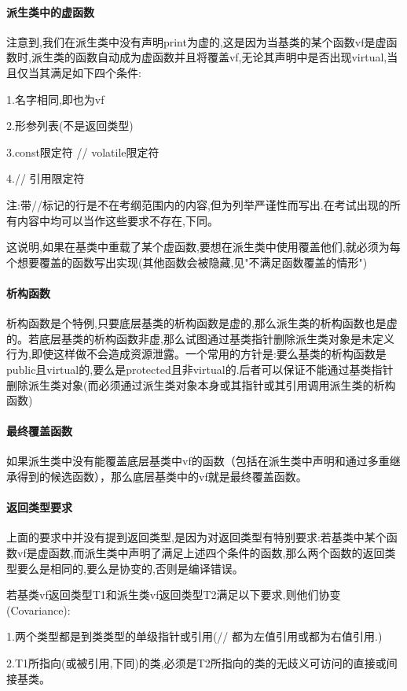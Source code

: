\documentclass[UTF8]{ctexart}
\begin{document}
\paragraph{派生类中的虚函数}
注意到,我们在派生类中没有声明print为虚的,这是因为当基类的某个函数vf是虚函数时,派生类的函数自动成为虚函数并且将覆盖vf,无论其声明中是否出现virtual,当且仅当其满足如下四个条件:

1.名字相同,即也为vf

2.形参列表(不是返回类型)

3.const限定符 // volatile限定符

4.// 引用限定符

注:带//标记的行是不在考纲范围内的内容,但为列举严谨性而写出.在考试出现的所有内容中均可以当作这些要求不存在,下同。

这说明,如果在基类中重载了某个虚函数,要想在派生类中使用覆盖他们,就必须为每个想要覆盖的函数写出实现(其他函数会被隐藏,见"不满足函数覆盖的情形")

\paragraph{析构函数}
析构函数是个特例,只要底层基类的析构函数是虚的,那么派生类的析构函数也是虚的。若底层基类的析构函数非虚,那么试图通过基类指针删除派生类对象是未定义行为,即使这样做不会造成资源泄露。一个常用的方针是:要么基类的析构函数是public且virtual的,要么是protected且非virtual的.后者可以保证不能通过基类指针删除派生类对象(而必须通过派生类对象本身或其指针或其引用调用派生类的析构函数)

\paragraph{最终覆盖函数}
如果派生类中没有能覆盖底层基类中vf的函数（包括在派生类中声明和通过多重继承得到的候选函数），那么底层基类中的vf就是最终覆盖函数。

\paragraph{返回类型要求}
上面的要求中并没有提到返回类型,是因为对返回类型有特别要求:若基类中某个函数vf是虚函数,而派生类中声明了满足上述四个条件的函数,那么两个函数的返回类型要么是相同的,要么是协变的,否则是编译错误。

若基类vf返回类型T1和派生类vf返回类型T2满足以下要求,则他们协变(Covariance):

1.两个类型都是到类类型的单级指针或引用(// 都为左值引用或都为右值引用.)

2.T1所指向(或被引用,下同)的类,必须是T2所指向的类的无歧义可访问的直接或间接基类。
\end{document}
